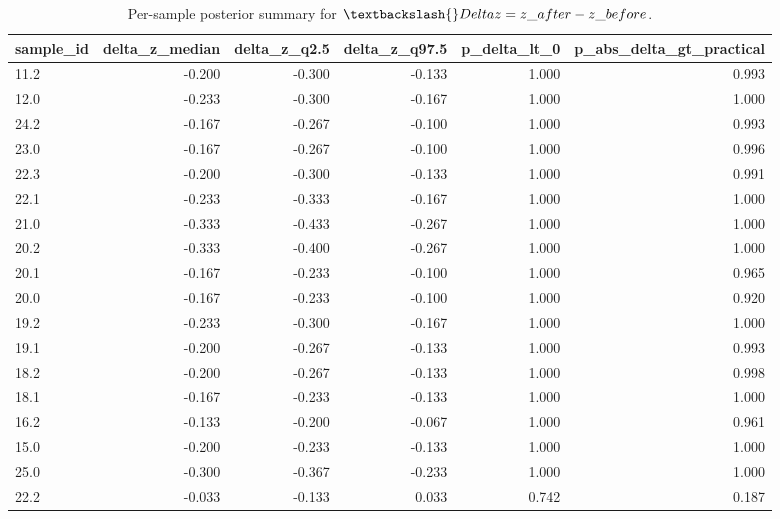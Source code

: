 \begin{table}[ht!]
\centering
\caption{Per-sample posterior summary for $\textbackslash{}Delta z = z\_{after}-z\_{before}$.}
\label{tab:bayes\_m1\_delta\_z\_per\_sample}
\begin{tabular}{lrrrrr}
\toprule
\textbf{sample\_id} & \textbf{delta\_z\_median} & \textbf{delta\_z\_q2.5} & \textbf{delta\_z\_q97.5} & \textbf{p\_delta\_lt\_0} & \textbf{p\_abs\_delta\_gt\_practical} \\
\midrule
11.2 & -0.200 & -0.300 & -0.133 & 1.000 & 0.993 \\
12.0 & -0.233 & -0.300 & -0.167 & 1.000 & 1.000 \\
24.2 & -0.167 & -0.267 & -0.100 & 1.000 & 0.993 \\
23.0 & -0.167 & -0.267 & -0.100 & 1.000 & 0.996 \\
22.3 & -0.200 & -0.300 & -0.133 & 1.000 & 0.991 \\
22.1 & -0.233 & -0.333 & -0.167 & 1.000 & 1.000 \\
21.0 & -0.333 & -0.433 & -0.267 & 1.000 & 1.000 \\
20.2 & -0.333 & -0.400 & -0.267 & 1.000 & 1.000 \\
20.1 & -0.167 & -0.233 & -0.100 & 1.000 & 0.965 \\
20.0 & -0.167 & -0.233 & -0.100 & 1.000 & 0.920 \\
19.2 & -0.233 & -0.300 & -0.167 & 1.000 & 1.000 \\
19.1 & -0.200 & -0.267 & -0.133 & 1.000 & 0.993 \\
18.2 & -0.200 & -0.267 & -0.133 & 1.000 & 0.998 \\
18.1 & -0.167 & -0.233 & -0.133 & 1.000 & 1.000 \\
16.2 & -0.133 & -0.200 & -0.067 & 1.000 & 0.961 \\
15.0 & -0.200 & -0.233 & -0.133 & 1.000 & 1.000 \\
25.0 & -0.300 & -0.367 & -0.233 & 1.000 & 1.000 \\
22.2 & -0.033 & -0.133 & 0.033 & 0.742 & 0.187 \\
\bottomrule
\end{tabular}
\end{table}
